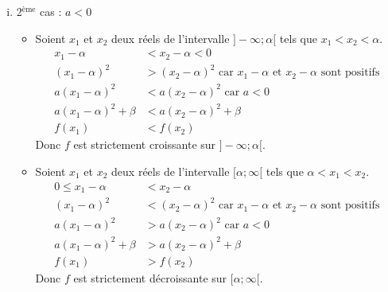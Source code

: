 \documentclass[10pt]{article} %
\begin{document}
{\begin{enumerate}[(i)]
        \item 2$^{\text{ème}}$ cas : $a<0$
              \begin{itemize}
                  \item Soient $x_1$ et $x_2$ deux réels de l'intervalle $]-\infty;\alpha[$ tels que $x_1<x_2<\alpha$.
                                    \begin{align*}
                                        x_1-\alpha            & <  x_2-\alpha < 0                                                                    \\
                                        (x_1-\alpha)^2        & >  (x_2-\alpha)^2 \text{ car }x_1-\alpha \text{ et }x_2-\alpha \text{ sont positifs} \\
                                        a(x_1-\alpha)^2       & < a(x_2-\alpha)^2 \text{ car } a<0                                                   \\
                                        a(x_1-\alpha)^2+\beta & < a(x_2-\alpha)^2+\beta                                                              \\
                                        f(x_1)                & < f(x_2)
                                    \end{align*}
                                    Donc $f$ est strictement croissante sur $]-\infty;\alpha[$.
                  \item Soient $x_1$ et $x_2$ deux réels de l'intervalle $[\alpha;\infty[$ tels que $\alpha<x_1<x_2$.
                        \begin{align*}
                            0\leq x_1-\alpha      & <  x_2-\alpha                                                                        \\
                            (x_1-\alpha)^2        & <  (x_2-\alpha)^2 \text{ car }x_1-\alpha \text{ et }x_2-\alpha \text{ sont positifs} \\
                            a(x_1-\alpha)^2       & > a(x_2-\alpha)^2 \text{ car } a<0                                                   \\
                            a(x_1-\alpha)^2+\beta & > a(x_2-\alpha)^2+\beta                                                              \\
                            f(x_1)                & > f(x_2)
                        \end{align*}
                        Donc $f$ est strictement décroissante sur $[\alpha;\infty[$.
              \end{itemize}
    \end{enumerate}
}
\end{document}
